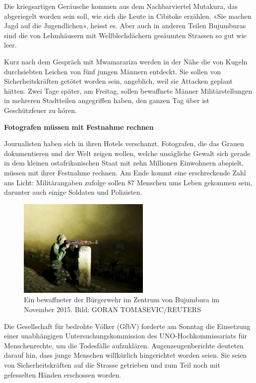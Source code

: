 \documentclass{article}
\begin{document}
	Die kriegsartigen Geräusche kommen aus dem Nachbarviertel Mutakura, das abgeriegelt worden sein soll, wie sich die Leute in Cibitoke erzählen. «Sie machen Jagd auf die Jugendlichen», heisst es. Aber auch in anderen Teilen Bujumburas sind die von Lehmhäusern mit Wellblechdächern gesäumten Strassen so gut wie leer. 
	
	Kurz nach dem Gespräch mit Mwamarariza werden in der Nähe die von Kugeln durchsiebten Leichen von fünf jungen Männern entdeckt. Sie sollen von Sicherheitskräften getötet worden sein, angeblich, weil sie Attacken geplant hätten. Zwei Tage später, am Freitag, sollen bewaffnete Männer Militärstellungen in mehreren Stadtteilen angegriffen haben, den ganzen Tag über ist Geschützfeuer zu hören.
	
	\textbf{Fotografen müssen mit Festnahme rechnen}
	
	Journalisten haben sich in ihren Hotels verschanzt. Fotografen, die das Grauen dokumentieren und der Welt zeigen wollen, welche unsägliche Gewalt sich gerade in dem kleinen ostafrikanischen Staat mit zehn Millionen Einwohnern abspielt, müssen mit ihrer Festnahme rechnen. Am Ende kommt eine erschreckende Zahl ans Licht: Militärangaben zufolge sollen 87 Menschen ums Leben gekommen sein, darunter auch einige Soldaten und Polizisten.
	
	
	\begin{figure}
		  \centering
		\includegraphics[width=180pt]{img/img2}
		\caption{Ein bewaffneter der Bürgerwehr im Zentrum von Bujumbura im November 2015. Bild: GORAN TOMASEVIC/REUTERS}
	\end{figure}
	
	Die Gesellschaft für bedrohte Völker (GfbV) forderte am Sonntag die Einsetzung einer unabhängigen Untersuchungskommission des UNO-Hochkommissariats für Menschenrechte, um die Todesfälle aufzuklären. Augenzeugenberichte deuteten darauf hin, dass junge Menschen willkürlich hingerichtet worden seien. Sie seien von Sicherheitskräften auf die Strasse getrieben und zum Teil noch mit gefesselten Händen erschossen worden.
	
\end{document}
